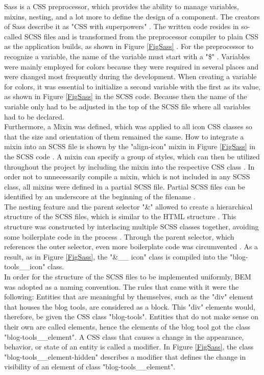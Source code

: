 \documentclass[Bachelor,BIF,english]{twbook}
\begin{document}
Sass is a CSS preprocessor, which provides the ability to manage variables, mixins, nesting, and a lot more to define the design of a component. The creators of Sass describe it as "CSS with superpowers" \cite{Sass}. The written code resides in so-called SCSS files and is transformed from the preprocessor compiler to plain CSS as the application builds, as shown in Figure \ref{FigSass} \cite[p.~168]{CSSPreproc}. For the preprocessor to recognize a variable, the name of the variable must start with a "\$" \cite[p.~169]{CSSPreproc} \cite{SassVariables}. Variables were mainly employed for colors because they were required in several places and were changed most frequently during the development. When creating a variable for colors, it was essential to initialize a second variable with the first as its value, as shown in Figure \ref{FigSass} in the SCSS code. Because then the name of the variable only had to be adjusted in the top of the SCSS file where all variables had to be declared. 
\\[\baselineskip]
Furthermore, a Mixin was defined, which was applied to all icon CSS classes so that the size and orientation of them remained the same. How to integrate a mixin into an SCSS file is shown by the "align-icon" mixin in Figure \ref{FigSass} in the SCSS code \cite{SassMixin}. A mixin can specify a group of styles, which can then be utilized throughout the project by including the mixin into the respective CSS class \cite[p.~170]{CSSPreproc} \cite{SassMixin}. In order not to unnecessarily compile a mixin, which is not included in any SCSS class, all mixins were defined in a partial SCSS file. Partial SCSS files can be identified by an underscore at the beginning of the filename \cite{SassPartial}.
\\[\baselineskip]
The nesting feature and the parent selector "\&" allowed to create a hierarchical structure of the SCSS files, which is similar to the HTML structure \cite[p.~169-170]{CSSPreproc} \cite{SassParent} \cite{SassNesting}. This structure was constructed by interlacing multiple SCSS classes together, avoiding some boilerplate code in the process \cite{SassNesting}. Through the parent selector, which references the outer selector, even more boilerplate code was circumvented \cite{SassParent}. As a result, as in Figure \ref{FigSass}, the "\&\_\_ icon" class is compiled into the "blog-tools\_\_icon" class.
\\[\baselineskip]
In order for the structure of the SCSS files to be implemented uniformly, BEM was adopted as a naming convention. The rules that came with it were the following: Entities that are meaningful by themselves, such as the "div" element that houses the blog tools, are considered as a block. This "div" elements would, therefore, be given the CSS class "blog-tools". Entities that do not make sense on their own are called elements, hence the elements of the blog tool got the class "blog-tools\_\_element". A CSS class that causes a change in the appearance, behavior, or state of an entity is called a modifier. In Figure \ref{FigSass}, the class "blog-tools\_\_element-hidden" describes a modifier that defines the change in visibility of an element of class "blog-tools\_\_element".
\end{document}
